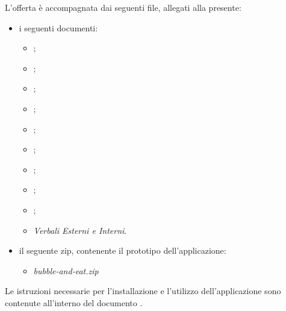 \begin{titlepage}
\begin{large}
	L'offerta è accompagnata dai seguenti file, allegati alla presente: 
	\begin{itemize}
		\item i seguenti documenti:
		\begin{itemize}
			\item \AnalisiDeiRequisiti{};
			\item \DefinizioneDiProdotto{};
			\item \ManualeUtenteDemo{};
			\item \ManualeUtenteFramework{};
			\item \Glossario{};
			\item \NormeDiProgetto{};
			\item \PianoDiProgetto{};
			\item \PianoDiQualifica{};
			\item \SpecificaTecnica{};
			\item \emph{Verbali Esterni e Interni}.
		\end{itemize}
		\item il seguente zip, contenente il prototipo dell'applicazione:
		\begin{itemize}
			\item \textit{bubble-and-eat.zip}
		\end{itemize}
	\end{itemize}

	\vspace{0.5cm}
	
	Le istruzioni necessarie per l'installazione e l'utilizzo dell'applicazione sono contenute all'interno del documento \ManualeUtenteDemo{}.\\
	\vspace{0.3cm}
	\end{large}
\end{titlepage}

